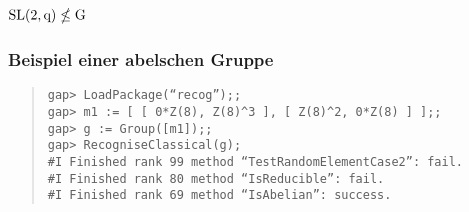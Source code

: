 \documentclass[a4paper,11pt]{article}
\theoremstyle{bla}
\begin{document}
\subsection{$\rm{SL}(2,q) \nleq G$}

\subsubsection*{Beispiel einer abelschen Gruppe}

\begin{quote}

\hspace*{-1cm} \texttt{gap> LoadPackage(``recog'');;}\\
\hspace*{-1cm} \texttt{gap> m1 := [ [ 0*Z(8), Z(8)\^{}3 ], [ Z(8)\^{}2, 0*Z(8) ] ];;}\\
\hspace*{-1cm} \texttt{gap> g := Group([m1]);;}\\
\hspace*{-1cm} \texttt{gap> RecogniseClassical(g);}\\

\hspace*{-1cm} \texttt{\#I  Finished rank 99 method ``TestRandomElementCase2'': fail.}\\
\hspace*{-1cm} \texttt{\#I  Finished rank 80 method ``IsReducible'': fail.}\\
\hspace*{-1cm} \texttt{\#I  Finished rank 69 method ``IsAbelian'': success.}


\end{quote}
\end{document}
